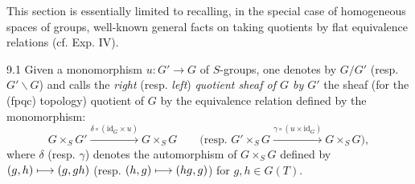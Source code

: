 This section is essentially limited to recalling, in the special case of homogeneous spaces of groups, well-known general facts on taking quotients by flat equivalence relations (cf. Exp. IV).

\begin{definition}{9.1}\label{VIB.9.1}
Given a monomorphism $u:G'\to G$ of $S$-groups, one denotes by $G/G'$ (resp. $G'\backslash G$) and calls the \emph{right} (resp. \emph{left}) \emph{quotient sheaf of $G$ by $G'$} the sheaf (for the (fpqc) topology) quotient of $G$ by the equivalence relation defined by the monomorphism:
\[
G\times_S G'\xrightarrow{\delta\circ(\mathrm{id}_G\times u)}G\times_S G\qquad\bigl(\text{resp. }G'\times_S G\xrightarrow{\gamma\circ(u\times\mathrm{id}_G)}G\times_S G\bigr),
\]
where $\delta$ (resp. $\gamma$) denotes the automorphism of $G\times_S G$ defined by $(g,h)\longmapsto(g,gh)$ (resp. $(h,g)\longmapsto(hg,g)$) for $g,h\in G(T)$.
\end{definition}

